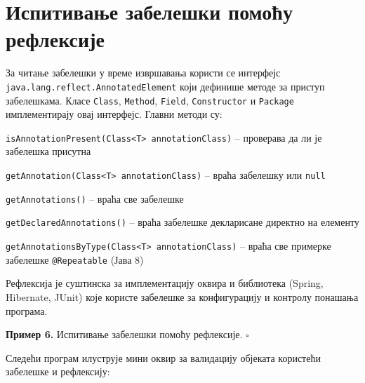 \section{Испитивање забелешки помоћу рефлексије}

За читање забелешки у време извршавања користи се интерфејс \texttt{java.lang.reflect.AnnotatedElement} који дефинише методе за приступ забелешкама. Класе \texttt{Class}, \texttt{Method}, \texttt{Field}, \texttt{Constructor} и \texttt{Package} имплементирају овај интерфејс. Главни методи су:

\texttt{isAnnotationPresent(Class\textless{}T\textgreater{} annotationClass)} – проверава да ли је забелешка присутна

\texttt{getAnnotation(Class\textless{}T\textgreater{} annotationClass)} – враћа забелешку или \texttt{null}

\texttt{getAnnotations()} – враћа све забелешке

\texttt{getDeclaredAnnotations()} – враћа забелешке декларисане директно на елементу

\texttt{getAnnotationsByType(Class\textless{}T\textgreater{} annotationClass)} – враћа све примерке забелешке \texttt{@Repeatable} (Јава 8)


Рефлексија је суштинска за имплементацију оквира и библиотека (Spring, Hibernate, JUnit) које користе забелешке за конфигурацију и контролу понашања програма.


\bigskip

\noindent \textbf{Пример 6.} Испитивање забелешки помоћу рефлексије. $\square$

\medskip

Следећи програм илуструје мини оквир за валидацију објеката користећи забелешке и рефлексију:

